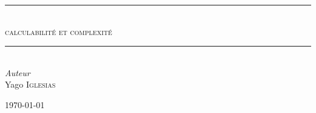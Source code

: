 \documentclass{article}
\begin{document}
\begin{titlepage}
	\newcommand{\HRule}{\rule{\linewidth}{0.5mm}}
	\center

	\HRule\\[0.4cm]

	\textsc{\Large calculabilité et complexité}\\[0.5cm]

	\HRule\\[1.5cm]

	{\large\textit{Auteur}}\\
	Yago \textsc{Iglesias}


	\vfill\vfill\vfill

	{\large\today}

	\vfill

\end{titlepage}

\tableofcontents




\newpage



\end{document}
